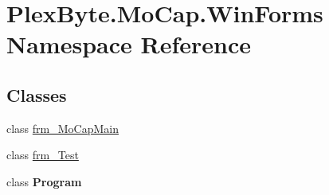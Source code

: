 \hypertarget{namespace_plex_byte_1_1_mo_cap_1_1_win_forms}{}\section{Plex\+Byte.\+Mo\+Cap.\+Win\+Forms Namespace Reference}
\label{namespace_plex_byte_1_1_mo_cap_1_1_win_forms}
\subsection*{Classes}
\begin{DoxyCompactItemize}
\item 
class \hyperlink{class_plex_byte_1_1_mo_cap_1_1_win_forms_1_1frm___mo_cap_main}{frm\+\_\+\+Mo\+Cap\+Main}
\item 
class \hyperlink{class_plex_byte_1_1_mo_cap_1_1_win_forms_1_1frm___test}{frm\+\_\+\+Test}
\item 
class {\bfseries Program}
\end{DoxyCompactItemize}
